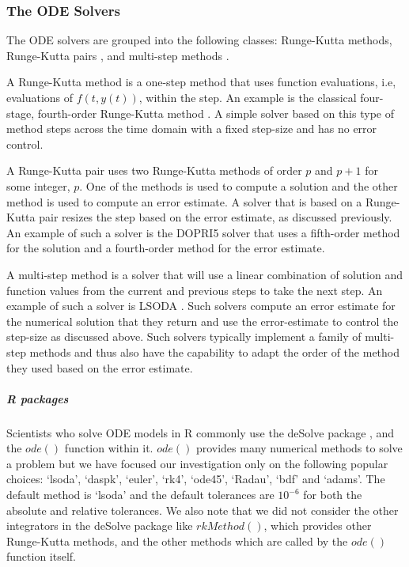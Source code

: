 \subsubsection{The ODE Solvers}
\label{subsection:numerical_software_used}
The ODE solvers are grouped into the following classes: Runge-Kutta methods, Runge-Kutta pairs \cite{MR3822086}, and multi-step methods \cite{MR3822086}.

A Runge-Kutta method is a one-step method that uses function evaluations, i.e, evaluations of $f(t, y(t))$, within the step. An example is the classical four-stage, fourth-order Runge-Kutta method \cite{MR3822086}. A simple solver based on this type of method steps across the time domain with a fixed step-size and has no error control.

A Runge-Kutta pair \cite{MR3822086} uses two Runge-Kutta methods of order $p$ and $p+1$ for some integer, $p$. One of the methods is used to compute a solution and the other method is used to compute an error estimate. A solver that is based on a Runge-Kutta pair resizes the step based on the error estimate, as discussed previously. An example of such a solver is the DOPRI5 solver \cite{MR3822086} that uses a fifth-order method for the solution and a fourth-order method for the error estimate.

A multi-step method is a solver that will use a linear combination of solution and function values from the current and previous steps to take the next step. An example of such a solver is LSODA \cite{MR3822086}. Such solvers compute an error estimate for the numerical solution that they return and use the error-estimate to control the step-size as discussed above. Such solvers typically implement a family of multi-step methods and thus also have the capability to adapt the order of the method they used based on the error estimate.

\subparagraph{R packages}
Scientists who solve ODE models in R commonly use the deSolve package \cite{soetaert2010solving}, and the $ode()$ function within it.
$ode()$ provides many numerical methods to solve a problem but we have focused our investigation only on the following popular choices: `lsoda', `daspk', `euler', `rk4', `ode45', `Radau', `bdf' and `adams'. The default method is `lsoda' and the default tolerances are $10^{-6}$ for both the absolute and relative tolerances. We also note that we did not consider the other integrators in the deSolve package like $rkMethod()$, which provides other Runge-Kutta methods, and the other methods which are called by the $ode()$ function itself.


